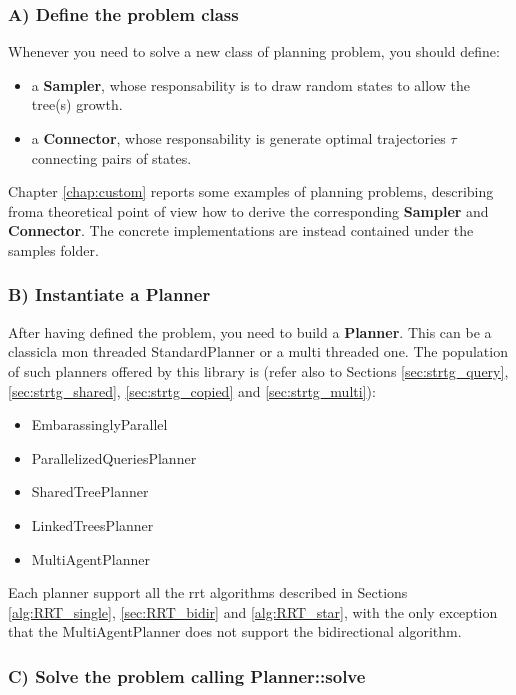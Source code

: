 \subsubsection{A) Define the problem class}
\label{sec:define_problem}

Whenever you need to solve a new class of planning problem, you should define:
\begin{itemize}
\item a \textbf{Sampler}, whose responsability is to draw random states to allow the tree(s) growth.
\item a \textbf{Connector}, whose responsability is generate optimal trajectories $\tau$ connecting pairs of states.
\end{itemize}
Chapter \ref{chap:custom} reports some examples of planning problems, describing froma theoretical point of view how to derive the corresponding \textbf{Sampler} and \textbf{Connector}.
The concrete implementations are instead contained under the samples folder.

\subsubsection{B) Instantiate a \textbf{Planner}}

After having defined the problem, you need to build a \textbf{Planner}.
This can be a classicla mon threaded StandardPlanner or a multi threaded one.
The population of such planners offered by this library is (refer also to Sections \ref{sec:strtg_query}, \ref{sec:strtg_shared}, \ref{sec:strtg_copied} and \ref{sec:strtg_multi}):
\begin{itemize}
\item EmbarassinglyParallel
\item ParallelizedQueriesPlanner
\item SharedTreePlanner
\item LinkedTreesPlanner
\item MultiAgentPlanner
\end{itemize}
Each planner support all the rrt algorithms described in Sections \ref{alg:RRT_single}, \ref{sec:RRT_bidir} and \ref{alg:RRT_star}, with the only exception that the MultiAgentPlanner does not support the bidirectional algorithm.

\subsubsection{C) Solve the problem calling \textbf{Planner}::solve}

